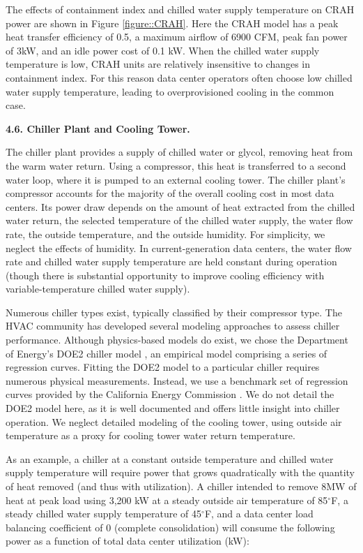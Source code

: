 The effects of containment index and chilled water supply temperature on CRAH power are shown in Figure \ref{figure::CRAH}. Here the CRAH model has a peak heat transfer efficiency of 0.5, a maximum airflow of 6900 CFM, peak fan power of 3kW, and an idle power cost of 0.1 kW.  When the chilled water supply temperature is low, CRAH units are relatively insensitive to changes in containment index.
For this reason data center operators often choose low chilled water supply temperature, leading to overprovisioned cooling in the common case.

{\bf 4.6. Chiller Plant and Cooling Tower.} 

The chiller plant provides a supply of chilled water or glycol, removing heat from the warm water return.
Using a compressor, this heat is transferred to a second water loop, where it is pumped to an external cooling tower.  The chiller plant's compressor accounts for the majority of the overall cooling cost in most data centers.  Its power draw depends on the amount of heat extracted from the chilled water return, the selected temperature of the chilled water supply, the water flow rate, the outside temperature, and the outside humidity.  For simplicity, we neglect the effects of humidity.  In current-generation data centers, the water flow rate and chilled water supply temperature are held constant during operation (though there is substantial opportunity to improve cooling efficiency with variable-temperature chilled water supply).

Numerous chiller types exist, typically classified by their compressor type.  The HVAC community has developed several modeling approaches to assess chiller performance. Although physics-based models do exist, we chose the Department of Energy's DOE2 chiller model \cite{DOE2}, an empirical model comprising a series of regression curves.  Fitting the DOE2 model to a particular chiller requires numerous physical measurements.  Instead, we use a benchmark set of regression curves provided by the California Energy Commission \cite{CEC}. We do not detail the DOE2 model here, as it is well documented and offers little insight into chiller operation.  We neglect detailed modeling of the cooling tower, using outside air temperature as a proxy for cooling tower water return temperature.

As an example, a chiller at a constant outside temperature and chilled water supply temperature will require power that grows quadratically with the quantity of heat removed (and thus with utilization).  A chiller intended to remove 8MW of heat at peak load using 3,200 kW at a steady outside air temperature of 85$^{\circ}$F, a steady chilled water supply temperature of 45$^{\circ}$F, and a data center load balancing coefficient of 0 (complete consolidation) will consume the following power as a function of total data center utilization (kW):

